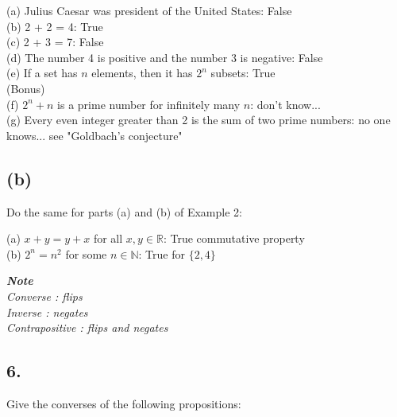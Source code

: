 \documentclass[11pt]{article}
\begin{document}
\begin{flushleft}
(a) Julius Caesar was president of the United States: False\\
(b) 2 + 2 = 4: True\\
(c) 2 + 3 = 7: False\\
(d) The number 4 is positive and the number 3 is negative: False\\
(e) If a set has $n$ elements, then it has $2^{n}$ subsets: True\\
(Bonus)\\
(f) $2^{n} + n $ is a prime number for infinitely many $n$: don't know...\\
(g) Every even integer greater than 2 is the sum of two prime numbers: no one knows... see "Goldbach's conjecture"\\
\end{flushleft}

\subsection*{(b)}
\begin{center}
Do the same for parts (a) and (b) of Example 2:
\end{center}

\begin{flushleft}
(a) $x + y = y + x$ for all $x,y \in \mathbb{R}$: True commutative property\\
(b) $2^{n} = n^{2}$ for some $n \in \mathbb{N}$: True for $\{2,4\}$\\
\end{flushleft}
%
%
\hfill \break
\hfill \break
\hfill \break
\hfill \break
%
%
\begin{center}
\textbf{\textit{Note}}\\
\textit{\hspace{0mm}Converse		: flips}\\
\textit{\hspace{8mm}Inverse		: negates}\\
\textit{\hspace{11mm}Contrapositive	: flips and negates}
\end{center}
%
%
\subsection*{6.}
\begin{center}
Give the converses of the following propositions:
\end{center}
\end{document}
